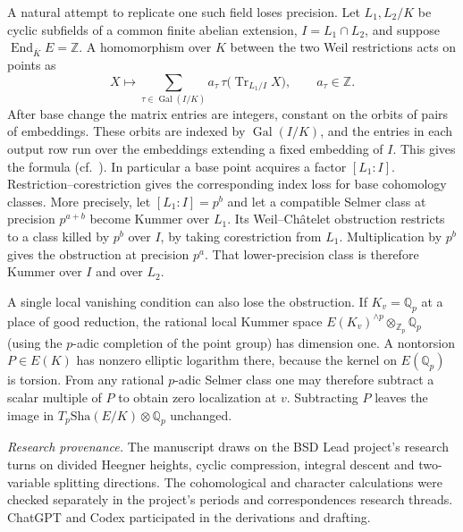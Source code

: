 \documentclass[11pt]{article}
\newcommand{\Z}{\mathbb Z}
\newcommand{\Q}{\mathbb Q}
\newcommand{\Gal}{\operatorname{Gal}}
\newcommand{\Sha}{\mathrm{Sha}}
\newcommand{\Tr}{\operatorname{Tr}}
\begin{document}
A natural attempt to replicate one such field loses precision. Let
$L_1,L_2/K$ be cyclic subfields of a common finite abelian
extension, $I=L_1\cap L_2$, and suppose
$\operatorname{End}_{\overline K}E=\Z$. A homomorphism over $K$
between the two Weil restrictions acts on points as
\[
 X\longmapsto\sum_{\tau\in\Gal(I/K)}
 a_\tau\,\tau\bigl(\Tr_{L_1/I}X\bigr),\qquad a_\tau\in\Z.
\]
After base change the matrix entries are integers, constant on the
orbits of pairs of embeddings. These orbits are indexed by
$\Gal(I/K)$, and the entries in each output row run over the
embeddings extending a fixed embedding of $I$. This gives the formula
(cf.\ \cite{MRS}). In particular a base point acquires a factor
$[L_1:I]$. Restriction--corestriction gives the corresponding index
loss for base cohomology classes. More precisely, let $[L_1:I]=p^b$ and let a compatible Selmer
class at precision $p^{a+b}$ become Kummer over $L_1$. Its
Weil--Ch\^atelet obstruction restricts to a class killed by $p^b$
over $I$, by taking corestriction from $L_1$. Multiplication by $p^b$
gives the obstruction at precision $p^a$. That lower-precision
class is therefore Kummer over $I$ and over $L_2$.

A single local vanishing condition can also lose the obstruction.
If $K_v=\Q_p$ at a place of good reduction, the rational local
Kummer space $E(K_v)^{\wedge p}\otimes_{\Z_p}\Q_p$ (using the $p$-adic
completion of the point group) has dimension one. A nontorsion
$P\in E(K)$ has nonzero elliptic logarithm there, because the
kernel on $E(\Q_p)$ is torsion. From any rational $p$-adic Selmer
class one may therefore subtract a scalar multiple of $P$ to
obtain zero localization at $v$. Subtracting $P$ leaves the image
in $T_p\Sha(E/K)\otimes\Q_p$ unchanged.


\medskip\noindent\textit{Research provenance.}
The manuscript draws on the BSD Lead project's research turns on
divided Heegner heights, cyclic compression, integral descent and
two-variable splitting directions. The cohomological and
character calculations were checked separately in the project's
periods and correspondences research threads. ChatGPT and Codex
participated in the derivations and drafting.
\end{document}
